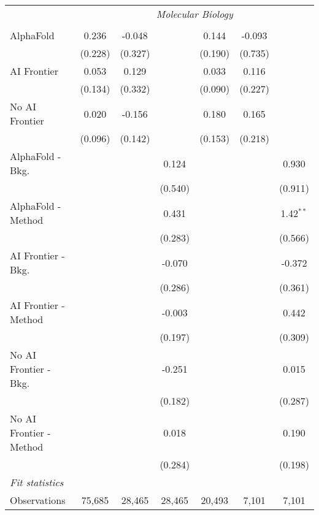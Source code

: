\begin{tabular}{lcccccc}
 & \multicolumn{6}{c}{\textit{Molecular Biology}} \\ \\
   AlphaFold               & 0.236   & -0.048  &         & 0.144   & -0.093  &   \\   
                           & (0.228) & (0.327) &         & (0.190) & (0.735) &   \\   
   AI Frontier             & 0.053   & 0.129   &         & 0.033   & 0.116   &   \\   
                           & (0.134) & (0.332) &         & (0.090) & (0.227) &   \\   
   No AI Frontier          & 0.020   & -0.156  &         & 0.180   & 0.165   &   \\   
                           & (0.096) & (0.142) &         & (0.153) & (0.218) &   \\   
   AlphaFold - Bkg.        &         &         & 0.124   &         &         & 0.930\\   
                           &         &         & (0.540) &         &         & (0.911)\\   
   AlphaFold - Method      &         &         & 0.431   &         &         & 1.42$^{**}$\\   
                           &         &         & (0.283) &         &         & (0.566)\\   
   AI Frontier - Bkg.      &         &         & -0.070  &         &         & -0.372\\   
                           &         &         & (0.286) &         &         & (0.361)\\   
   AI Frontier - Method    &         &         & -0.003  &         &         & 0.442\\   
                           &         &         & (0.197) &         &         & (0.309)\\   
   No AI Frontier - Bkg.   &         &         & -0.251  &         &         & 0.015\\   
                           &         &         & (0.182) &         &         & (0.287)\\   
   No AI Frontier - Method &         &         & 0.018   &         &         & 0.190\\   
                           &         &         & (0.284) &         &         & (0.198)\\   
   \midrule
   \emph{Fit statistics}\\
   Observations            & 75,685  & 28,465  & 28,465  & 20,493  & 7,101   & 7,101\\  
   

\end{tabular}
